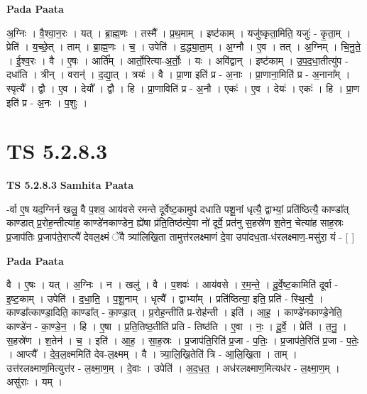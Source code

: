 \documentclass[17pt]{extarticle}
\begin{document}
\textbf{Pada Paata} \newline

अ॒ग्निः । वै॒श्वा॒न॒रः । यत् । ब्रा॒ह्म॒णः । तस्मै᳚ । प्र॒थ॒माम् । इष्ट॑काम् । यजु॑ष्कृता॒मिति॒ यजुः॑ - कृ॒ता॒म् । प्रेति॑ । य॒च्छे॒त् । ताम् । ब्रा॒ह्म॒णः । च॒ । उपेति॑ । द॒द्ध्या॒ता॒म् । अ॒ग्नौ । ए॒व । तत् । अ॒ग्निम् । चि॒नु॒ते॒ । ई॒श्व॒रः । वै । ए॒षः । आर्ति᳚म् । आर्तो॒रित्या-अ॒र्तोः॒ । यः । अवि॑द्वान् । इष्ट॑काम् । उ॒प॒द॒धा॒तीत्यु॑प - दधा॑ति । त्रीन् । वरान्॑ । द॒द्या॒त् । त्रयः॑ । वै । प्रा॒णा इति॑ प्र - अ॒नाः । प्रा॒णाना॒मिति॑ प्र - अ॒नाना᳚म् । स्पृत्यै᳚ । द्वौ । ए॒व । देयौ᳚ । द्वौ । हि । प्रा॒णाविति॑ प्र - अ॒नौ । एकः॑ । ए॒व । देयः॑ । एकः॑ । हि । प्रा॒ण इति॑ प्र - अ॒नः । प॒शुः ।  \newline




\section*{ TS 5.2.8.3 }

\textbf{TS 5.2.8.3 } \newline
\textbf{Samhita Paata} \newline

-र्वा ए॒ष यद॒ग्निर्न खलु॒ वै प॒शव॒ आय॑वसे रमन्ते दूर्वेष्ट॒कामुप॑ दधाति पशू॒नां धृत्यै॒ द्वाभ्यां॒ प्रति॑ष्ठित्यै॒ काण्डा᳚त् काण्डात् प्र॒रोह॒न्तीत्या॑ह॒ काण्डे॑नकाण्डेन॒ ह्ये॑षा प्र॑ति॒तिष्ठ॑त्ये॒वा नो॑ दूर्वे॒ प्रत॑नु स॒हस्रे॑ण श॒तेन॒ चेत्या॑ह साह॒स्रः प्र॒जाप॑तिः प्र॒जाप॑ते॒राप्त्यै॑ देवल॒क्ष्मं ॅवै त्र्या॑लिखि॒ता तामुत्त॑रलक्ष्माणं दे॒वा उपा॑दध॒ता-ध॑रलक्ष्माण॒-मसु॑रा॒ यं - [  ] \newline

\textbf{Pada Paata} \newline

वै । ए॒षः । यत् । अ॒ग्निः । न । खलु॑ । वै । प॒शवः॑ । आय॑वसे । र॒म॒न्ते॒ । दू॒र्वे॒ष्ट॒कामिति॑ दूर्वा - इ॒ष्ट॒काम् । उपेति॑ । द॒धा॒ति॒ । प॒शू॒नाम् । धृत्यै᳚ । द्वाभ्या᳚म् । प्रति॑ष्ठित्या॒ इति॒ प्रति॑ - स्थि॒त्यै॒ । काण्डा᳚त्काण्डा॒दिति॒ काण्डा᳚त् - का॒ण्डा॒त् । प्र॒रोह॒न्तीति॑ प्र-रोह॑न्ती । इति॑ । आ॒ह॒ । काण्डे॑नकाण्डे॒नेति॒ काण्डे॑न - का॒ण्डे॒न॒ । हि । ए॒षा । प्र॒ति॒तिष्ठ॒तीति॑ प्रति - तिष्ठ॑ति । ए॒वा । नः॒ । दू॒र्वे॒ । प्रेति॑ । त॒नु॒ । स॒हस्रे॑ण । श॒तेन॑ । च॒ । इति॑ । आ॒ह॒ । सा॒ह॒स्रः । प्र॒जाप॑ति॒रिति॑ प्र॒जा - प॒तिः॒ । प्र॒जाप॑ते॒रिति॑ प्र॒जा - प॒तेः॒ । आप्त्यै᳚ । दे॒व॒ल॒क्ष्ममिति॑ देव-ल॒क्ष्मम् । वै । त्र्या॒लि॒खि॒तेति॑ त्रि - आ॒लि॒खि॒ता । ताम् । उत्त॑रलक्ष्माण॒मित्युत्त॑र - ल॒क्ष्मा॒ण॒म् । दे॒वाः । उपेति॑ । अ॒द॒ध॒त॒ । अध॑रलक्ष्माण॒मित्यध॑र - ल॒क्ष्मा॒ण॒म् । असु॑राः । यम् ।  \newline
\end{document}
